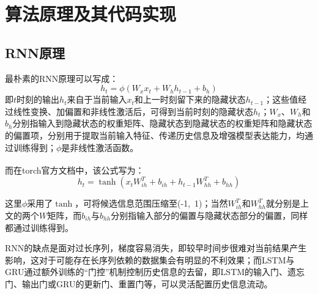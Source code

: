 \documentclass[12pt, oneside, a4paper]{ctexart}
\begin{document}
\section{算法原理及其代码实现}
\subsection{RNN原理}
\par{}
最朴素的RNN原理可以写成：
\begin{equation*}
    h_t = \phi(W_x x_t + W_h h_{t-1} + b_h)
\end{equation*}
即$t$时刻的输出$h_t$来自于当前输入$x_t$和上一时刻留下来的隐藏状态$h_{t-1}$；这些值经过线性变换、加偏置和非线性激活后，可得到当前时刻的隐藏状态$h_t$；$W_x$、$W_h$和$b_h$分别指输入到隐藏状态的权重矩阵、隐藏状态到隐藏状态的权重矩阵和隐藏状态的偏置项，分别用于提取当前输入特征、传递历史信息及增强模型表达能力，均通过训练得到；$\phi$是非线性激活函数。
\par{}
而在torch官方文档中，该公式\textsuperscript{\color{red}\cite{ref1}}写为：
\begin{equation*}
    h_t = \tanh(x_t W_{ih}^{T} + b_{ih} + h_{t-1} W_{hh}^{T} + b_{hh})
\end{equation*}
\par{}
这里$\phi$采用了$\tanh$，可将候选信息范围压缩至(-1,~1)；当然$W_{ih}^{T}$和$W_{hh}^{T}$就分别是上文的两个$W$矩阵，而$b_{ih}$与$b_{hh}$分别指输入部分的偏置与隐藏状态部分的偏置，同样都通过训练得到。
\par{}
RNN的缺点是面对过长序列，梯度容易消失，即较早时间步很难对当前结果产生影响，这对于可能存在长序列依赖的数据集会有明显的不利效果；而LSTM与GRU通过额外训练的“门控”机制控制历史信息的去留，即LSTM的输入门、遗忘门、输出门或GRU的更新门、重置门等，可以灵活配置历史信息流动。
\vspace{0.25cm}
\end{document}
